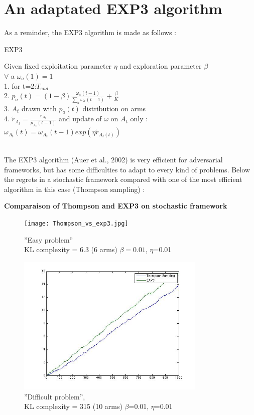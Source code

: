 \documentclass[12pt]{article}
\begin{document}
\section*{An adaptated EXP3 algorithm}

As a reminder, the EXP3 algorithm is made as follows : 
\FloatBarrier
\begin{algorithm}
\caption{EXP3}\label{RS}
Given fixed exploitation parameter $\eta$ and exploration parameter $\beta$\\
$\forall$ a $\omega_{a}(1)=1$\\
1. for t=2:$T_{end}$\\
2. $p_{a}(t) = (1-\beta)\frac{\omega_{a}(t-1)}{\sum_{a}\omega_{a}(t-1)}+\frac{\beta}{K}$\\
3. $A_{t}$ drawn with $p_{a}(t)$ distribution on arms\\
4. $\tilde{r}_{A_{t}} = \frac{r_{A_{t}}}{p_{A_{t}}(t-1)}$ and update of $\omega$ on $A_{t}$ only : $\omega_{A_{t}}(t)=\omega_{A_{t}}(t-1)exp(\eta \tilde{r}_{A_{t}(t)})$\\
\end{algorithm}
\FloatBarrier
~\\
The EXP3 algorithm (Auer et al., 2002) is very efficient for adversarial frameworks, but has some difficulties to adapt to every kind of problems. Below the regrets in a stochastic framework compared with one of the most efficient algorithm in this case (Thompson sampling) :
\begin{center} \textbf{Comparaison of Thompson and EXP3 on stochastic framework}\end{center}
 \begin{figure}[!h]
   \begin{minipage}[c]{0.5 \linewidth}
   \centering
    \captionsetup{justification=centering,margin=1cm}
      \texttt{[image: Thompson\_vs\_exp3.jpg]}
      \caption{''Easy problem''\\KL complexity = 6.3 (6 arms) $\beta=0.01$, $\eta$=0.01}
   \end{minipage} \hfill
   \begin{minipage}[c]{0.5 \linewidth}
   \centering
   \captionsetup{justification=centering,margin=1cm}
      \includegraphics[width=9cm]{complexPbVs.jpg}
      \caption{''Difficult problem'',\\KL complexity = 315 (10 arms) $\beta$=0.01, $\eta$=0.01}
   \end{minipage} 
\end{figure}
\end{document}
